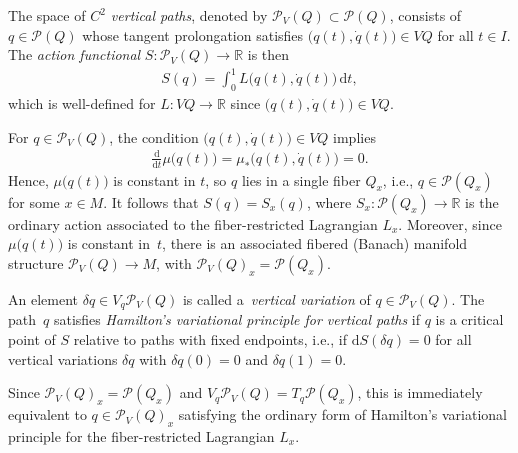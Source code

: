 \documentclass[10pt,a4paper]{amsart}
\numberwithin{equation}{section}
\begin{document}
\begin{Definition} The space of \emph{$ C ^2 $ vertical paths}, denoted by $ \mathcal{P} _V (Q) \subset \mathcal{P} (Q) $, consists of $ q \in \mathcal{P} (Q) $ whose tangent prolongation satisf\/ies $ \bigl( q (t) , \dot{q} (t) \bigr) \in V Q $ for all $ t \in I $. The \emph{action functional} $ S \colon \mathcal{P} _V (Q) \rightarrow \mathbb{R} $ is then
 \begin{gather*}
 S (q) = \int _0 ^1 L \bigl( q (t) , \dot{q} (t) \bigr) \,\mathrm{d}t ,
 \end{gather*}
which is well-def\/ined for $ L \colon V Q \rightarrow \mathbb{R} $ since $ \bigl( q (t) , \dot{q} (t) \bigr) \in V Q $.
\end{Definition}

\begin{Remark} For $ q \in \mathcal{P} _V (Q) $, the condition $ \bigl( q (t) , \dot{q} (t) \bigr) \in V Q $ implies
 \begin{gather*}
 \frac{\mathrm{d}}{\mathrm{d}t} \mu \bigl( q (t) \bigr) = \mu _\ast \bigl( q (t) , \dot{q} (t) \bigr) = 0 .
 \end{gather*}
Hence, $ \mu \bigl( q (t) \bigr) $ is constant in $t$, so $q$ lies in a single f\/iber $ Q _x $, i.e., $ q \in \mathcal{P} ( Q _x ) $ for some $ x \in M $. It follows that $ S (q) = S _x ( q ) $, where $ S _x \colon \mathcal{P} ( Q _x ) \rightarrow \mathbb{R} $ is the ordinary action associated to the f\/iber-restricted Lagrangian $ L _x $. Moreover, since $ \mu \bigl( q (t) \bigr) $ is constant in~$t$, there is an associated f\/ibered (Banach) manifold structure $ \mathcal{P} _V (Q) \rightarrow M $, with $ \mathcal{P} _V (Q) _x = \mathcal{P} ( Q _x ) $.
\end{Remark}

\begin{Definition} \label{def:verticalHamilton}
An element $ \delta q \in V _q \mathcal{P} _V (Q) $ is called a~\emph{vertical variation} of $ q \in \mathcal{P} _V (Q) $. The path~$q$ satisf\/ies \emph{Hamilton's variational principle for vertical paths} if $q$ is a critical point of $S$ relative to paths with f\/ixed endpoints, i.e., if $ \mathrm{d} S ( \delta q ) = 0 $ for all vertical variations $ \delta q $ with $ \delta q (0) = 0 $ and $ \delta q (1) = 0 $.
\end{Definition}

\begin{Remark} Since $ \mathcal{P} _V (Q) _x = \mathcal{P} ( Q _x ) $ and $ V _q \mathcal{P} _V (Q) = T _q \mathcal{P} ( Q _x ) $, this is immediately equivalent to $q \in \mathcal{P} _V (Q) _x $ satisfying the ordinary form of Hamilton's variational principle for the f\/iber-restricted Lagrangian $ L _x $.
\end{Remark}
\end{document}

